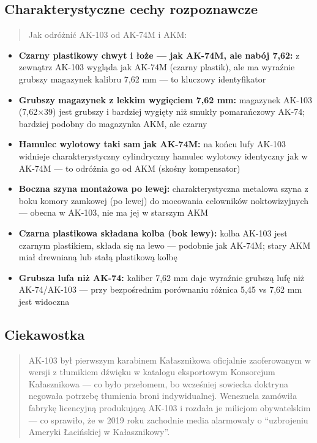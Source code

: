 \documentclass[12pt,oneside]{book}
\providecommand{\tightlist}{%
  \setlength{\itemsep}{0pt}\setlength{\parskip}{0pt}}
\begin{document}
\subsection{Charakterystyczne cechy
rozpoznawcze}\label{charakterystyczne-cechy-rozpoznawcze-63}

\begin{quote}
Jak odróżnić AK-103 od AK-74M i AKM:
\end{quote}

\begin{itemize}
\tightlist
\item
  \textbf{Czarny plastikowy chwyt i łoże --- jak AK-74M, ale nabój
  7,62:} z zewnątrz AK-103 wygląda jak AK-74M (czarny plastik), ale ma
  wyraźnie grubszy magazynek kalibru 7,62 mm --- to kluczowy
  identyfikator
\item
  \textbf{Grubszy magazynek z lekkim wygięciem 7,62 mm:} magazynek
  AK-103 (7,62×39) jest grubszy i bardziej wygięty niż smukły
  pomarańczowy AK-74; bardziej podobny do magazynka AKM, ale czarny
\item
  \textbf{Hamulec wylotowy taki sam jak AK-74M:} na końcu lufy AK-103
  widnieje charakterystyczny cylindryczny hamulec wylotowy identyczny
  jak w AK-74M --- to odróżnia go od AKM (skośny kompensator)
\item
  \textbf{Boczna szyna montażowa po lewej:} charakterystyczna metalowa
  szyna z boku komory zamkowej (po lewej) do mocowania celowników
  noktowizyjnych --- obecna w AK-103, nie ma jej w starszym AKM
\item
  \textbf{Czarna plastikowa składana kolba (bok lewy):} kolba AK-103
  jest czarnym plastikiem, składa się na lewo --- podobnie jak AK-74M;
  stary AKM miał drewnianą lub stałą plastikową kolbę
\item
  \textbf{Grubsza lufa niż AK-74:} kaliber 7,62 mm daje wyraźnie grubszą
  lufę niż AK-74/AK-103 --- przy bezpośrednim porównaniu różnica 5,45 vs
  7,62 mm jest widoczna
\end{itemize}

\subsection{Ciekawostka}\label{ciekawostka-63}

\begin{quote}
AK-103 był pierwszym karabinem Kałasznikowa oficjalnie zaoferowanym w
wersji z tłumikiem dźwięku w katalogu eksportowym Konsorcjum
Kałasznikowa --- co było przełomem, bo wcześniej sowiecka doktryna
negowała potrzebę tłumienia broni indywidualnej. Wenezuela zamówiła
fabrykę licencyjną produkującą AK-103 i rozdała je milicjom obywatelskim
--- co sprawiło, że w 2019 roku zachodnie media alarmowały o
``uzbrojeniu Ameryki Łacińskiej w Kałasznikowy''.
\end{quote}
\end{document}
